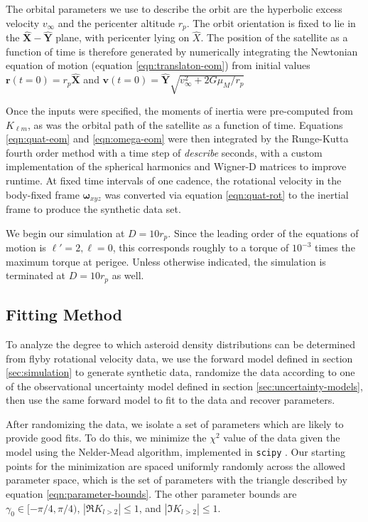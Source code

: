 \documentclass{aastex631}
\newcommand{\unit}[1]{\hat{\mathbf{#1}}}
\newcommand{\jtd}[1]{{\color{red}\textit{#1}}}
\begin{document}
The orbital parameters we use to describe the orbit are the hyperbolic excess velocity $v_\infty$ and the pericenter altitude $r_p$. The orbit orientation is fixed to lie in the $\unit X-\unit Y$ plane, with pericenter lying on $\hat X$. The position of the satellite as a function of time is therefore generated by numerically integrating the Newtonian equation of motion (equation \ref{eqn:translaton-eom}) from initial values $\mathbf r(t=0) = r_p \unit X$ and $\mathbf v(t=0)=\unit Y \sqrt{v_\infty^2 + 2G\mu_M / r_p}$

Once the inputs were specified, the moments of inertia were pre-computed from $K_{\ell m}$, as was the orbital path of the satellite as a function of time. Equations \ref{eqn:quat-eom} and \ref{eqn:omega-eom} were then integrated by the Runge-Kutta fourth order method with a time step of \jtd{describe} seconds, with a custom implementation of the spherical harmonics and Wigner-D matrices to improve runtime. At fixed time intervals of one cadence, the rotational velocity in the body-fixed frame $\mathbf\omega_{xyz}$ was converted via equation \ref{eqn:quat-rot} to the inertial frame to produce the synthetic data set.

We begin our simulation at $D = 10 r_p$. Since the leading order of the equations of motion is $\ell' = 2, \ell = 0$, this corresponds roughly to a torque of $10^{-3}$ times the maximum torque at perigee. Unless otherwise indicated, the simulation is terminated at $D=10 r_p$ as well.


\subsection{Fitting Method}
\label{sec:fitting-method}
To analyze the degree to which asteroid density distributions can be determined from flyby rotational velocity data, we use the forward model defined in section \ref{sec:simulation} to generate synthetic data, randomize the data according to one of the observational uncertainty model defined in section \ref{sec:uncertainty-models}, then use the same forward model to fit to the data and recover parameters.

After randomizing the data, we isolate a set of parameters which are likely to provide good fits. To do this, we minimize the $\chi^2$ value of the data given the model using the Nelder-Mead algorithm, implemented in \texttt{scipy} \cite{NelderMead}. Our starting points for the minimization are spaced uniformly randomly across the allowed parameter space, which is the set of parameters with the triangle described by equation \ref{eqn:parameter-bounds}. The other parameter bounds are $\gamma_0 \in [-\pi/4, \pi/4)$, $|\Re K_{l>2}| \leq 1$, and $|\Im K_{l>2}| \leq  1$.
\end{document}
